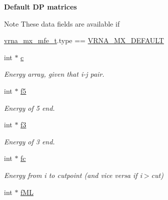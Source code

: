 \begin{Indent}{\bf Default D\+P matrices}\par
{\em \begin{DoxyNote}{Note}
These data fields are available if 
\begin{DoxyCode}
\hyperlink{group__dp__matrices_structvrna__mx__mfe__s}{vrna\_mx\_mfe\_t}.type == \hyperlink{group__dp__matrices_gga6042ea1d58d01931e959791be6d89343aafa2568956dab79595521e20c49a5f75}{VRNA\_MX\_DEFAULT} 
\end{DoxyCode}
 
\end{DoxyNote}
}\begin{DoxyCompactItemize}
\item 
\hypertarget{group__dp__matrices_a60a511fd42905ee4f046c56a76865bf9}{}int $\ast$ \hyperlink{group__dp__matrices_a60a511fd42905ee4f046c56a76865bf9}{c}\label{group__dp__matrices_a60a511fd42905ee4f046c56a76865bf9}

\begin{DoxyCompactList}\small\item\em Energy array, given that i-\/j pair. \end{DoxyCompactList}\item 
\hypertarget{group__dp__matrices_abebad693be987c2701d64477ab858039}{}int $\ast$ \hyperlink{group__dp__matrices_abebad693be987c2701d64477ab858039}{f5}\label{group__dp__matrices_abebad693be987c2701d64477ab858039}

\begin{DoxyCompactList}\small\item\em Energy of 5\textquotesingle{} end. \end{DoxyCompactList}\item 
\hypertarget{group__dp__matrices_a4ea4595a93733adef047ece8e6f5da52}{}int $\ast$ \hyperlink{group__dp__matrices_a4ea4595a93733adef047ece8e6f5da52}{f3}\label{group__dp__matrices_a4ea4595a93733adef047ece8e6f5da52}

\begin{DoxyCompactList}\small\item\em Energy of 3\textquotesingle{} end. \end{DoxyCompactList}\item 
\hypertarget{group__dp__matrices_a8ee6b6cefe20cfbf1f6bef5c788b6667}{}int $\ast$ \hyperlink{group__dp__matrices_a8ee6b6cefe20cfbf1f6bef5c788b6667}{fc}\label{group__dp__matrices_a8ee6b6cefe20cfbf1f6bef5c788b6667}

\begin{DoxyCompactList}\small\item\em Energy from i to cutpoint (and vice versa if i$>$cut) \end{DoxyCompactList}\item 
\hypertarget{group__dp__matrices_a103995e4ab8e21e7f8bc36a6edcb1331}{}int $\ast$ \hyperlink{group__dp__matrices_a103995e4ab8e21e7f8bc36a6edcb1331}{f\+M\+L}\label{group__dp__matrices_a103995e4ab8e21e7f8bc36a6edcb1331}


\end{DoxyCompactItemize}
\end{Indent}
